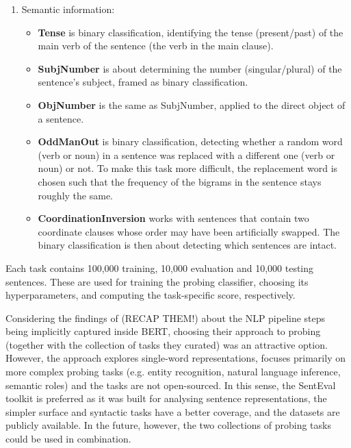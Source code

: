 \documentclass[bsc,frontabs,twoside,singlespacing,parskip,deptreport]{infthesis}
\begin{document}
{{\begin{enumerate}
{\begin{itemize}
        \end{itemize}
      }
      \item{Semantic information:
        \begin{itemize}
          \item \textbf{Tense} is binary classification, identifying the tense (present/past) of the main verb of the sentence (the verb in the main clause).
          \item \textbf{SubjNumber} is about determining the number (singular/plural) of the sentence's subject, framed as binary classification.
          \item \textbf{ObjNumber} is the same as SubjNumber, applied to the direct object of a sentence.
          \item \textbf{OddManOut} is binary classification, detecting whether a random word (verb or noun) in a sentence was replaced with a different one (verb or noun) or not. To make this task more difficult, the replacement word is chosen such that the frequency of the bigrams in the sentence stays roughly the same.
          \item \textbf{CoordinationInversion} works with sentences that contain two coordinate clauses whose order may have been artificially swapped. The binary classification is then about detecting which sentences are intact.
        \end{itemize}
      }
    \end{enumerate}

    Each task contains 100,000 training, 10,000 evaluation and 10,000 testing sentences. These are used for training the probing classifier, choosing its hyperparameters, and computing the task-specific score, respectively.

    Considering the findings of \citet{Tenney_2019b} (RECAP THEM!) about the NLP pipeline steps being implicitly captured inside BERT, choosing their approach to probing (together with the collection of tasks they curated) was an attractive option. However, the approach explores single-word representations, focuses primarily on more complex probing tasks (e.g. entity recognition, natural language inference, semantic roles) and the tasks are not open-sourced. In this sense, the SentEval toolkit is preferred as it was built for analysing sentence representations, the simpler surface and syntactic tasks have a better coverage, and the datasets are publicly available. In the future, however, the two collections of probing tasks could be used in combination.
  }
}
\end{document}
